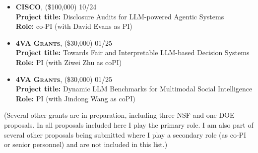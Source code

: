 \begin{itemize}
	\item \textbf{\textsc{CISCO}}, 
	(\$100,000) \hfill \textsc{10/24}\\
	{\bf Project title:} {Disclosure Audits for LLM-powered Agentic Systems}\\
	{\bf Role:} co-PI (with David Evans as PI)

	\item \textbf{\textsc{4VA Grants}}, 
	(\$30,000) \hfill \textsc{01/25}\\
	{\bf Project title:} {Towards Fair and Interpretable LLM-based Decision Systems}\\
	{\bf Role:} PI (with Ziwei Zhu as coPI)

	\item \textbf{\textsc{4VA Grants}}, 
	(\$30,000) \hfill \textsc{01/25}\\
	{\bf Project title:} {Dynamic LLM Benchmarks for Multimodal Social Intelligence}\\
	{\bf Role:} PI (with Jindong Wang as coPI)


\end{itemize}

(Several other grants are in preparation, including three NSF and one DOE proposals.  
In all proposals included here I play the primary role. I am also part of several other proposals being submitted where I 
play a secondary role (as co-PI or senior personnel) and are not included in this list.)

